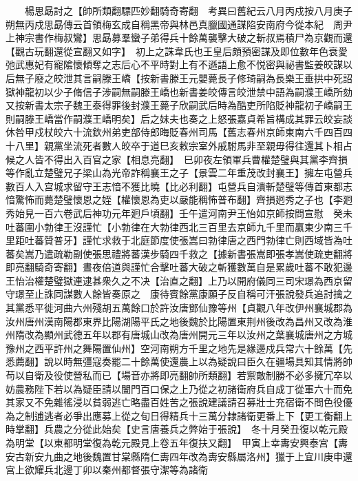 　　楊思勗討之【帥所類翻驃匹妙翻騎奇寄翻　考異曰舊紀云八月丙戍按八月庚子朔無丙戍思勗傳云首領梅玄成自稱黑帝與林邑真臘國通謀陷安南府今從本紀　周尹上神宗書作梅叔鸞】思勗募羣蠻子弟得兵十餘萬襲擊大破之斬叔焉積尸為京觀而還【觀古玩翻還從宣翻又如字】　初上之誅韋氏也王皇后頗預密謀及即位數年色衰愛弛武惠妃有寵隂懷傾奪之志后心不平時對上有不遜語上愈不悦密與祕書監姜皎謀以后無子廢之皎泄其言嗣滕王嶠【按新書滕王元嬰薨長子修琦嗣為長樂王垂拱中死詔獄神龍初以少子脩信子涉嗣無嗣滕王嶠也新書姜皎傳言皎泄禁中語為嗣濮王嶠所劾又按新書太宗子魏王泰得罪後封濮王薨子欣嗣武后時為酷吏所陷貶神龍初子嶠嗣王則嗣滕王嶠當作嗣濮王嶠明矣】后之妹夫也奏之上怒張嘉貞希旨構成其罪云皎妄談休咎甲戍杖皎六十流欽州弟吏部侍郎晦貶春州司馬【舊志春州京師東南六千四百四十八里】親黨坐流死者數人皎卒于道巳亥敕宗室外戚駙馬非至親毋得往還其卜相占候之人皆不得出入百官之家【相息亮翻】　巳卯夜左領軍兵曹權楚璧與其黨李齊損等作亂立楚璧兄子梁山為光帝詐稱襄王之子【景雲二年重茂改封襄王】擁左屯營兵數百人入宫城求留守王志愔不獲比曉【比必利翻】屯營兵自潰斬楚璧等傳首東都志愔驚怖而薨楚璧懷恩之姪【權懷恩為吏以嚴能稱怖普布翻】齊損㢠秀之子也【李㢠秀始見一百六卷武后神功元年㢠戶頃翻】壬午遣河南尹王怡如京師按問宣慰　癸未吐蕃圍小勃律王沒謹忙【小勃律在大勃律西北三百里去京師九千里而贏東少南三千里距吐蕃贊普牙】謹忙求救于北庭節度使張嵩曰勃律唐之西門勃律亡則西域皆為吐蕃矣嵩乃遣疏勒副使張思禮將蕃漢步騎四千救之【據新書張嵩即張孝嵩使疏吏翻將即亮翻騎奇寄翻】晝夜倍道與謹忙合擊吐蕃大破之斬獲數萬自是累歲吐蕃不敢犯邊　王怡治權楚璧獄連逮甚衆久之不决【治直之翻】上乃以開府儀同三司宋璟為西京留守璟至止誅同謀數人餘皆奏原之　康待賓餘黨康願子反自稱可汗張說發兵追討擒之其黨悉平徙河曲六州殘胡五萬餘口於許汝唐鄧仙豫等州【貞觀八年改伊州襄城郡為汝州唐州漢南陽郡東界比陽湖陽平氏之地後魏於比陽置東荆州後改為昌州又改為淮州隋改為顯州武德五年以郡有唐城山改為唐州開元三年以汝州之葉襄城唐州之方城豫州之西平許州之舞陽置仙州】空河南朔方千里之地先是緣邊戍兵常六十餘萬【先悉薦翻】說以時無彊寇奏罷二十餘萬使還農上以為疑說曰臣久在疆場具知其情將帥苟以自衛及役使營私而已【場音亦將即亮翻帥所類翻】若禦敵制勝不必多擁冗卒以妨農務陛下若以為疑臣請以闔門百口保之上乃從之初諸衛府兵自成丁從軍六十而免其家又不免雜徭浸以貧弱逃亡略盡百姓苦之張說建議請召募壯士充宿衛不問色役優為之制逋逃者必爭出應募上從之旬日得精兵十三萬分隸諸衛更番上下【更工衡翻上時掌翻】兵農之分從此始矣【史言唐養兵之弊始于張說】　冬十月癸丑復以乾元殿為明堂【以東都明堂復為乾元殿見上卷五年復扶又翻】　甲寅上幸夀安興泰宫【夀安古新安九曲之地後魏置甘棠縣隋仁夀四年改為夀安縣屬洛州】獵于上宜川庚申還宫上欲耀兵北邊丁卯以秦州都督張守潔等為諸衛


